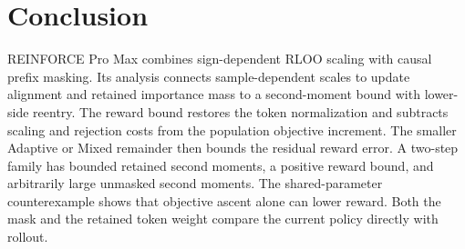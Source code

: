 \section{Conclusion}
REINFORCE Pro Max combines sign-dependent RLOO scaling with causal prefix
masking. Its analysis connects sample-dependent scales to update alignment
and retained importance mass to a second-moment bound with lower-side reentry.
The reward bound restores the token normalization and subtracts scaling
and rejection costs from the population objective increment.
The smaller Adaptive or Mixed remainder then bounds the residual reward error. A two-step family has bounded retained second moments, a positive
reward bound, and arbitrarily large unmasked second moments. The shared-parameter
counterexample shows that objective ascent alone can lower reward. Both
the mask and the retained token weight compare the current policy directly with rollout.
